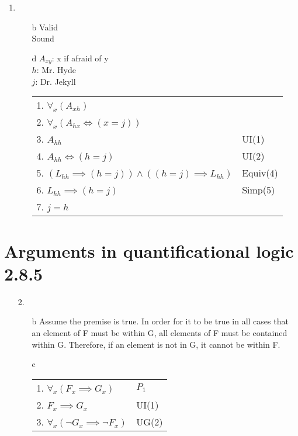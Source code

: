 \documentclass{article}
\begin{document}
\begin{enumerate}
\begin{enumerate}
			\end{enumerate}
		\item
			\begin{enumerate}
				\item[b]
					Valid\\
					Sound
				\item[d]
					$A_{xy}$: x if afraid of y\\ 
					$h$: Mr. Hyde\\
					$j$: Dr. Jekyll\\
					\begin{tabular}{l l}
						1. $\forall _x (A_{xh})$\\
						2. $\forall _x (A_{hx} \iff (x = j))$\\
						3. $A_{hh}$ & UI(1)\\
						4. $A_{hh} \iff (h = j)$ & UI(2)\\
						5. $(L_{hh} \implies (h = j)) \land ((h = j) \implies L_{hh})$ & Equiv(4)\\
						6. $L_{hh} \implies (h = j)$ & Simp(5)\\
						7. $j = h$
					\end{tabular}
			\end{enumerate}
	\end{enumerate}
	\section{Arguments in quantificational logic 2.8.5}
	\begin{enumerate}
		\item[2.]
			\begin{enumerate}
				\item[b]
					Assume the premise is true. In order for it to be true in all cases that an element of F must be within G, all elements of F must be contained within G. Therefore, if an element is not in G, it cannot be within F.
				\item[c]
					\begin{tabular}{l l}
						1. $\forall _x(F_x \implies G_x)$ & $P_1$\\
						2. $F_x \implies G_x$ & UI(1)\\
						3. $\forall _x(\lnot G_x \implies \lnot F_x)$ & UG(2)\\
					\end{tabular}
			\end{enumerate}
	\end{enumerate}
\end{document}
